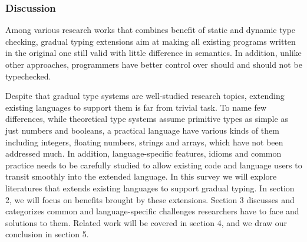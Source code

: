 \subsubsection{Discussion}

Among various research works that combines
benefit of static and dynamic type checking,
gradual typing extensions aim at
making all existing programs written
in the original one still valid with little difference in semantics.
In addition, unlike other approaches, programmers have better control over should and should not be typechecked.

Despite that gradual type systems are well-studied research topics,
extending existing languages to support them is far from trivial task.
To name few differences, while theoretical type systems assume primitive types as simple as just numbers and booleans,
a practical language have various kinds of them including integers, floating numbers, strings and arrays,
which have not been addressed much.
In addition, language-specific features, idioms and common practice needs
to be carefully studied to allow existing code and language users to transit smoothly into
the extended language. In this survey we will explore literatures that extends existing languages to support gradual typing.
In section 2, we will focus on benefits brought by these extensions.
Section 3 discusses and categorizes common and language-specific
challenges researchers have to face and solutions to them.
Related work will be covered in section 4, and
we draw our conclusion in section 5.